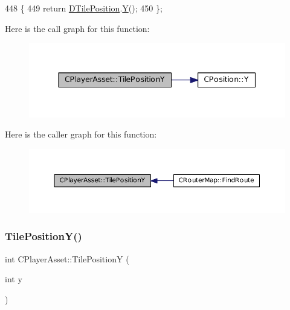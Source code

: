 \begin{DoxyCode}
448                                  \{
449             \textcolor{keywordflow}{return} \hyperlink{classCPlayerAsset_a5b59a9d3b7db8c7fa194b80dafb96186}{DTilePosition}.\hyperlink{classCPosition_a1aa8a30e2f08dda1f797736ba8c13a87}{Y}();  
450         \};
\end{DoxyCode}
Here is the call graph for this function\+:\nopagebreak
\begin{figure}[H]
\begin{center}
\leavevmode
\includegraphics[width=344pt]{classCPlayerAsset_a189adb25bf0a45117a9c0bb36b45e6a4_cgraph}
\end{center}
\end{figure}
Here is the caller graph for this function\+:\nopagebreak
\begin{figure}[H]
\begin{center}
\leavevmode
\includegraphics[width=350pt]{classCPlayerAsset_a189adb25bf0a45117a9c0bb36b45e6a4_icgraph}
\end{center}
\end{figure}
\hypertarget{classCPlayerAsset_ad3ce562cbd27e2c35abe968a7ff19cd6}{}\label{classCPlayerAsset_ad3ce562cbd27e2c35abe968a7ff19cd6} 
\subsubsection{\texorpdfstring{Tile\+Position\+Y()}{TilePositionY()}\hspace{0.1cm}{\footnotesize\ttfamily [2/2]}}
{\footnotesize\ttfamily int C\+Player\+Asset\+::\+Tile\+PositionY (\begin{DoxyParamCaption}\item[{int}]{y }\end{DoxyParamCaption})}



